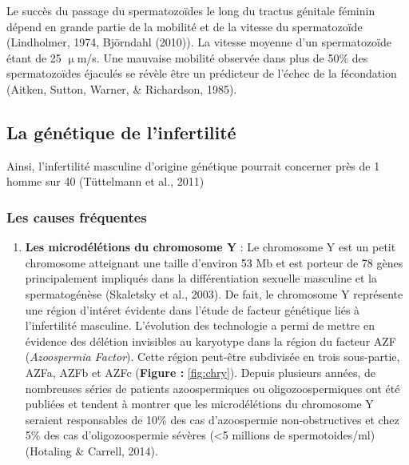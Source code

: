 \documentclass[12pt,twoside]{reedthesis}
\providecommand{\tightlist}{%
  \setlength{\itemsep}{0pt}\setlength{\parskip}{0pt}}
\theoremstyle{definition}
\theoremstyle{definition}
\theoremstyle{remark}
\begin{document}
  Le succès du passage du spermatozoïdes le long du tractus génitale
  féminin dépend en grande partie de la mobilité et de la vitesse du
  spermatozoïde (Lindholmer, 1974, Björndahl (2010)). La vitesse moyenne
  d'un spermatozoïde étant de 25 \(\upmu\)m/s. Une mauvaise mobilité
  observée dans plus de 50\% des spermatozoïdes éjaculés se révèle être un
  prédicteur de l'échec de la fécondation (Aitken, Sutton, Warner, \&
  Richardson, 1985).
  
  \subsection{La génétique de
  l'infertilité}\label{la-genetique-de-linfertilite}
  
  Ainsi, l'infertilité masculine d'origine génétique pourrait concerner
  près de 1 homme sur 40 (Tüttelmann et al., 2011)
  
  \subsubsection{Les causes fréquentes}\label{les-causes-frequentes}
  
  \begin{enumerate}
  \def\labelenumi{\arabic{enumi}.}
  \tightlist
  \item
    \textbf{Les microdélétions du chromosome Y} : Le chromosome Y est un
    petit chromosome atteignant une taille d'environ 53 Mb et est porteur
    de 78 gènes principalement impliqués dans la différentiation sexuelle
    masculine et la spermatogénèse (Skaletsky et al., 2003). De fait, le
    chromosome Y représente une région d'intéret évidente dans l'étude de
    facteur génétique liés à l'infertilité masculine. L'évolution des
    technologie a permi de mettre en évidence des délétion invisibles au
    karyotype dans la région du facteur AZF (\emph{Azoospermia Factor}).
    Cette région peut-être subdivisée en trois sous-partie, AZFa, AZFb et
    AZFc (\textbf{Figure :} \ref{fig:chry}). Depuis plusieurs années, de
    nombreuses séries de patients azoospermiques ou oligozoospermiques ont
    été publiées et tendent à montrer que les microdélétions du chromosome
    Y seraient responsables de 10\% des cas d'azoospermie non-obstructives
    et chez 5\% des cas d'oligozoospermie sévères (\textless{}5 millions
    de spermotoides/ml) (Hotaling \& Carrell, 2014).
  \end{enumerate}
  
\end{document}
